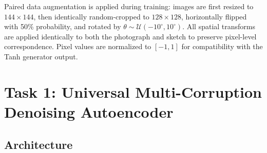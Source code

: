 \documentclass[conference]{IEEEtran}
\begin{document}
Paired data augmentation is applied during training: images are first resized to $144 \times 144$, then identically random-cropped to $128 \times 128$, horizontally flipped with 50\% probability, and rotated by $\theta \sim \mathcal{U}(-10^\circ, 10^\circ)$. All spatial transforms are applied identically to both the photograph and sketch to preserve pixel-level correspondence. Pixel values are normalized to $[-1, 1]$ for compatibility with the Tanh generator output.

\section{Task 1: Universal Multi-Corruption Denoising Autoencoder}
\label{sec:task1}

\subsection{Architecture}
\end{document}
